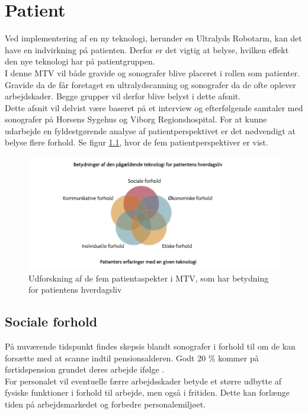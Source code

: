 \chapter{Patient}
Ved implementering af en ny teknologi, herunder en Ultralyds Robotarm, kan det have en indvirkning på patienten. Derfor er det vigtig at belyse, hvilken effekt den nye teknologi har på patientgruppen. \\
I denne MTV vil både gravide og sonografer blive placeret i rollen som patienter. Gravide da de får foretaget en ultralydscanning og sonografer da de ofte oplever arbejdskader. Begge grupper vil derfor blive belyst i dette afsnit.  \\ \newline
Dette afsnit vil delvist være baseret på et interview og efterfølgende samtaler med sonografer på Horsens Sygehus og Viborg Regionshospital. 
\newline
For at kunne udarbejde en fyldestgørende analyse af patientperspektivet er det nødvendigt at belyse flere forhold. Se figur \ref{patientMTV}, hvor de fem patientperspektiver er vist. 
\begin{figure}[h!]\centering
	\includegraphics[width = 1.0\textwidth]{Figurer/PatientaspekterMTV}
	\caption{Udforskning af de fem patientaspekter i MTV, som har betydning for patientens hverdagsliv}
	\label{patientMTV}
\end{figure}

\section{Sociale forhold}
På nuværende tidspunkt findes skepsis blandt sonografer i forhold til om de kan forsætte med at scanne indtil pensionsalderen. Godt 20 \% kommer på førtidspension grundet deres arbejde ifølge \cite{BeckyMorton2007}. \\ 
For personalet vil eventuelle færre arbejdsskader betyde et større udbytte af fysiske funktioner i forhold til arbejde, men også i fritiden. Dette kan forlænge tiden på arbejdsmarkedet og forbedre personalemiljøet.       

